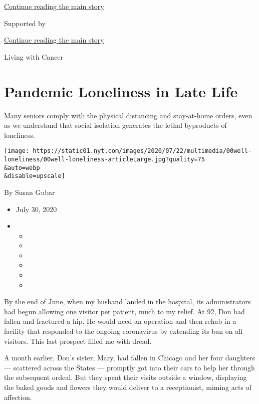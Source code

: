 \protect\hyperlink{after-top}{Continue reading the main story}

Supported by

\protect\hyperlink{after-sponsor}{Continue reading the main story}

Living with Cancer

\hypertarget{pandemic-loneliness-in-late-life}{%
\section{Pandemic Loneliness in Late
Life}\label{pandemic-loneliness-in-late-life}}

Many seniors comply with the physical distancing and stay-at-home
orders, even as we understand that social isolation generates the lethal
byproducts of loneliness.

\texttt{[image: https://static01.nyt.com/images/2020/07/22/multimedia/00well-loneliness/00well-loneliness-articleLarge.jpg?quality=75\\\&auto=webp\\\&disable=upscale]}

By Susan Gubar

\begin{itemize}
\item
  July 30, 2020
\item
  \begin{itemize}
  \item
  \item
  \item
  \item
  \item
  \item
  \end{itemize}
\end{itemize}

By the end of June, when my husband landed in the hospital, its
administrators had begun allowing one visitor per patient, much to my
relief. At 92, Don had fallen and fractured a hip. He would need an
operation and then rehab in a facility that responded to the ongoing
coronavirus by extending its ban on all visitors. This last prospect
filled me with dread.

A month earlier, Don's sister, Mary, had fallen in Chicago and her four
daughters --- scattered across the States --- promptly got into their
cars to help her through the subsequent ordeal. But they spent their
visits outside a window, displaying the baked goods and flowers they
would deliver to a receptionist, miming acts of affection.

